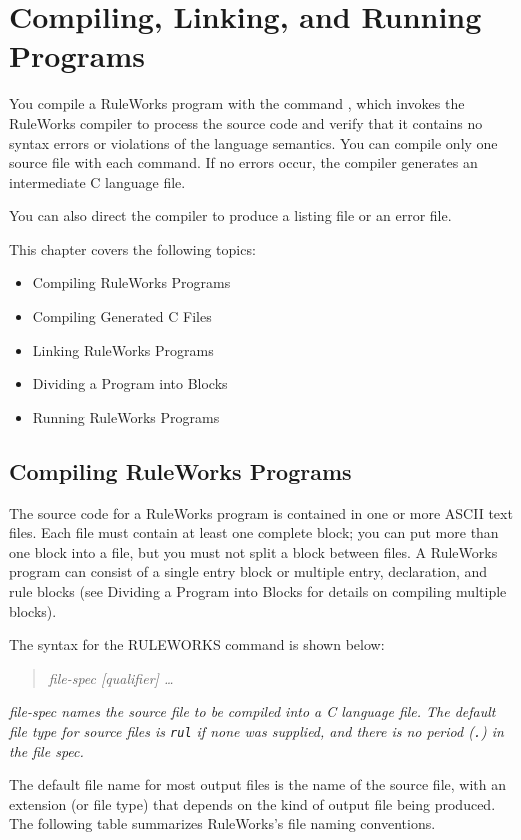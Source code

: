 \chapter{Compiling, Linking, and Running Programs}

You compile a RuleWorks program with the command
, which invokes the RuleWorks compiler to
process the source code and verify that it contains no
syntax errors or violations of the language semantics.
You can compile only one source file with each 
command. If no errors occur, the compiler generates an
intermediate C language file.

You can also direct the compiler to produce a listing
file or an error file.

This chapter covers the following topics:
\begin{itemize}
\item Compiling RuleWorks Programs
\item Compiling Generated C Files
\item Linking RuleWorks Programs
\item Dividing a Program into Blocks
\item Running RuleWorks Programs
\end{itemize}

\section{Compiling RuleWorks Programs}

The source code for a RuleWorks program is contained in
one or more ASCII text files. Each file must contain at
least one complete block; you can put more than one block
into a file, but you must not split a block between
files. A RuleWorks program can consist of a single entry
block or multiple entry, declaration, and rule blocks
(see Dividing a Program into Blocks for details on
compiling multiple blocks).

The syntax for the RULEWORKS command is shown below:
\begin{quote}
 \it{file-spec} [\it{qualifier}] \ldots
\end{quote}
\it{file-spec} names the source file to be compiled into a C
language file. The default file type for source files is
\verb|rul| if none was supplied, and there is no period (\verb|.|) in
the file spec.

The default file name for most output files is the name of the source
file, with an extension (or file type) that depends on the kind of
output file being produced. The following table summarizes RuleWorks's
file naming conventions.

